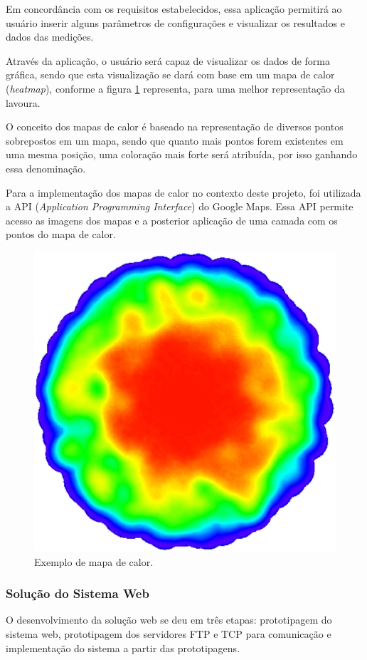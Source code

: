   Em concordância com os requisitos estabelecidos, essa aplicação
  permitirá ao usuário inserir alguns parâmetros de configurações e visualizar
  os resultados e dados das medições.

  Através da aplicação, o usuário será capaz de visualizar os dados de forma gráfica,
  sendo que esta visualização se dará com base em um mapa de calor (\textit{heatmap}), conforme a figura \ref{fig:heatmap} representa, para uma melhor representação da lavoura.

  O conceito dos mapas de calor é baseado na representação de diversos pontos sobrepostos em um mapa, sendo que quanto mais pontos
  forem existentes em uma mesma posição, uma coloração mais forte será atribuída, por isso ganhando essa denominação.

  Para a implementação dos mapas de calor no contexto deste projeto, foi utilizada a API (\textit{Application Programming Interface})
  do Google Maps. Essa API permite acesso as imagens dos mapas e a posterior aplicação de uma camada com os pontos do mapa de calor.

  \begin{figure}[!htbp]
  \begin{center}
  \includegraphics[width=.5\textwidth]{figuras/heatmap.eps}
  \caption{\label{fig:heatmap}Exemplo de mapa de calor.}
  \end{center}
  \end{figure}

  \subsubsection{Solução do Sistema Web}
  O desenvolvimento da solução web se deu em três etapas: prototipagem do sistema web,
  prototipagem dos servidores FTP e TCP para comunicação e implementação do sistema
  a partir das prototipagens.

